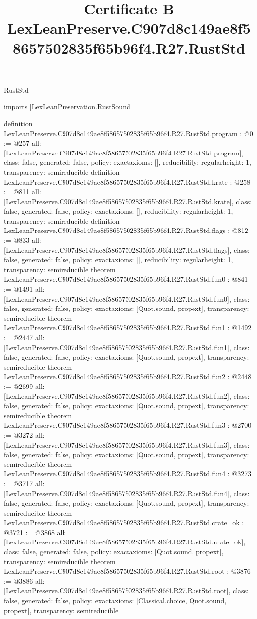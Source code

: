 \begin{lexlean}{RustStd}
\title{Certificate B LexLeanPreserve.C907d8c149ae8f58657502835f65b96f4.R27.RustStd}
\begin{coremodule}
imports [LexLeanPreservation.RustSound]

definition LexLeanPreserve.C907d8c149ae8f58657502835f65b96f4.R27.RustStd.program : @0 := @257 {
  all: [LexLeanPreserve.C907d8c149ae8f58657502835f65b96f4.R27.RustStd.program],
  class: false,
  generated: false,
  policy: exact{axioms: []},
  reducibility: regular{height: 1},
  transparency: semireducible
}
definition LexLeanPreserve.C907d8c149ae8f58657502835f65b96f4.R27.RustStd.krate : @258 := @811 {
  all: [LexLeanPreserve.C907d8c149ae8f58657502835f65b96f4.R27.RustStd.krate],
  class: false,
  generated: false,
  policy: exact{axioms: []},
  reducibility: regular{height: 1},
  transparency: semireducible
}
definition LexLeanPreserve.C907d8c149ae8f58657502835f65b96f4.R27.RustStd.flags : @812 := @833 {
  all: [LexLeanPreserve.C907d8c149ae8f58657502835f65b96f4.R27.RustStd.flags],
  class: false,
  generated: false,
  policy: exact{axioms: []},
  reducibility: regular{height: 1},
  transparency: semireducible
}
theorem LexLeanPreserve.C907d8c149ae8f58657502835f65b96f4.R27.RustStd.fun0 : @841 := @1491 {
  all: [LexLeanPreserve.C907d8c149ae8f58657502835f65b96f4.R27.RustStd.fun0],
  class: false,
  generated: false,
  policy: exact{axioms: [Quot.sound, propext]},
  transparency: semireducible
}
theorem LexLeanPreserve.C907d8c149ae8f58657502835f65b96f4.R27.RustStd.fun1 : @1492 := @2447 {
  all: [LexLeanPreserve.C907d8c149ae8f58657502835f65b96f4.R27.RustStd.fun1],
  class: false,
  generated: false,
  policy: exact{axioms: [Quot.sound, propext]},
  transparency: semireducible
}
theorem LexLeanPreserve.C907d8c149ae8f58657502835f65b96f4.R27.RustStd.fun2 : @2448 := @2699 {
  all: [LexLeanPreserve.C907d8c149ae8f58657502835f65b96f4.R27.RustStd.fun2],
  class: false,
  generated: false,
  policy: exact{axioms: [Quot.sound, propext]},
  transparency: semireducible
}
theorem LexLeanPreserve.C907d8c149ae8f58657502835f65b96f4.R27.RustStd.fun3 : @2700 := @3272 {
  all: [LexLeanPreserve.C907d8c149ae8f58657502835f65b96f4.R27.RustStd.fun3],
  class: false,
  generated: false,
  policy: exact{axioms: [Quot.sound, propext]},
  transparency: semireducible
}
theorem LexLeanPreserve.C907d8c149ae8f58657502835f65b96f4.R27.RustStd.fun4 : @3273 := @3717 {
  all: [LexLeanPreserve.C907d8c149ae8f58657502835f65b96f4.R27.RustStd.fun4],
  class: false,
  generated: false,
  policy: exact{axioms: [Quot.sound, propext]},
  transparency: semireducible
}
theorem LexLeanPreserve.C907d8c149ae8f58657502835f65b96f4.R27.RustStd.crate_ok : @3721 := @3868 {
  all: [LexLeanPreserve.C907d8c149ae8f58657502835f65b96f4.R27.RustStd.crate_ok],
  class: false,
  generated: false,
  policy: exact{axioms: [Quot.sound, propext]},
  transparency: semireducible
}
theorem LexLeanPreserve.C907d8c149ae8f58657502835f65b96f4.R27.RustStd.root : @3876 := @3886 {
  all: [LexLeanPreserve.C907d8c149ae8f58657502835f65b96f4.R27.RustStd.root],
  class: false,
  generated: false,
  policy: exact{axioms: [Classical.choice, Quot.sound, propext]},
  transparency: semireducible
}


\end{coremodule}
\end{lexlean}
